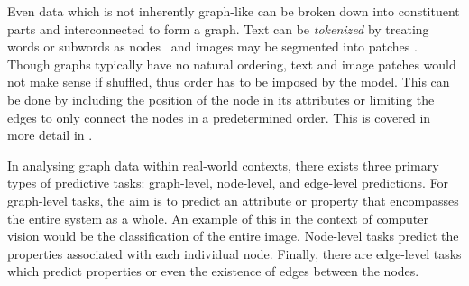 Even data which is not inherently graph-like can be broken down into constituent parts and interconnected to form a graph.
Text can be \textit{tokenized} by treating words or subwords as nodes~\cite{Attention} and images may be segmented into patches .
Though graphs typically have no natural ordering, text and image patches would not make sense if shuffled, thus order has to be imposed by the model.
This can be done by including the position of the node in its attributes or limiting the edges to only connect the nodes in a predetermined order.
This is covered in more detail in .

In analysing graph data within real-world contexts, there exists three primary types of predictive tasks: graph-level, node-level, and edge-level predictions.
For graph-level tasks, the aim is to predict an attribute or property that encompasses the entire system as a whole.
An example of this in the context of computer vision would be the classification of the entire image.
Node-level tasks predict the properties associated with each individual node.
Finally, there are edge-level tasks which predict properties or even the existence of edges between the nodes.

